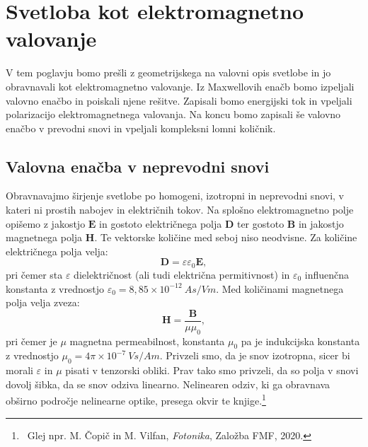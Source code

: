 
\chapter{Svetloba kot elektromagnetno valovanje}
V tem poglavju bomo prešli z geometrijskega  na valovni opis svetlobe in jo 
obravnavali kot elektromagnetno valovanje. Iz Maxwellovih enačb
bomo izpeljali valovno enačbo in poiskali njene rešitve.
Zapisali bomo energijski tok
in vpeljali polarizacijo elektromagnetnega valovanja. Na koncu
bomo zapisali še valovno enačbo v prevodni snovi in vpeljali 
kompleksni lomni količnik. 

\section{Valovna enačba v neprevodni snovi}
Obravnavajmo širjenje svetlobe po homogeni, izotropni in neprevodni snovi, 
v kateri ni prostih nabojev in električnih tokov. Na splošno elektromagnetno polje
opišemo z jakostjo  $\mathbf{E}$ in gostoto električnega polja $\mathbf{D}$
ter gostoto $\mathbf{B}$ in jakostjo magnetnega polja $\mathbf{H}$. Te vektorske
količine med seboj niso neodvisne. Za količine električnega polja velja:
\begin{equation}
\mathbf{D} = \varepsilon \varepsilon_0 \mathbf{E},
\label{eq:DE}
\end{equation}
pri čemer sta $\varepsilon$ dielektričnost (ali tudi električna permitivnost)
in $\varepsilon_0$
influenčna konstanta z vrednostjo $\varepsilon_0 = 8,85 \times 10^{-12}~\si{As/Vm}$. 
Med količinami magnetnega polja velja zveza:
\begin{equation}
\mathbf{H} = \frac{\mathbf{B}}{\mu \mu_0},
\label{eq:HB}
\end{equation}
pri čemer je $\mu$ magnetna permeabilnost, konstanta $\mu_0$ pa je 
indukcijska konstanta z vrednostjo $\mu_0 = 4 \pi \times 10^{-7}~\si{Vs/Am}$.
Privzeli smo, da je snov izotropna, sicer bi morali $\varepsilon$ in $\mu$ pisati v 
tenzorski obliki. Prav tako smo privzeli, da so polja v snovi dovolj šibka, da
se snov odziva linearno. Nelinearen odziv, ki ga obravnava obširno področje
nelinearne optike, presega okvir te knjige.\footnote{~Glej npr. M. Čopič in M. Vilfan, 
{\it Fotonika}, Založba FMF, 2020.}

